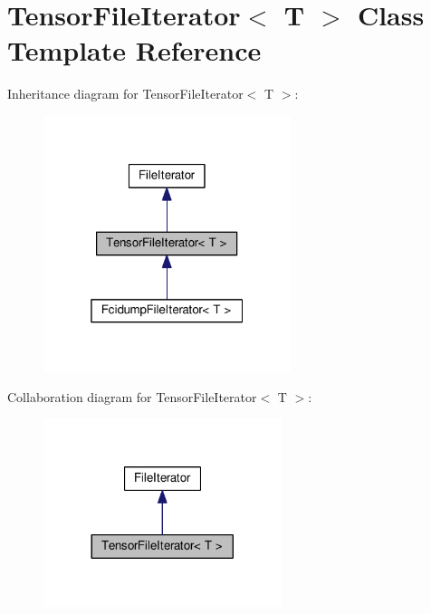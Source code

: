 \hypertarget{classTensorFileIterator}{}\section{Tensor\+File\+Iterator$<$ T $>$ Class Template Reference}
\label{classTensorFileIterator}


Inheritance diagram for Tensor\+File\+Iterator$<$ T $>$\+:
\nopagebreak
\begin{figure}[H]
\begin{center}
\leavevmode
\includegraphics[width=205pt]{classTensorFileIterator__inherit__graph}
\end{center}
\end{figure}


Collaboration diagram for Tensor\+File\+Iterator$<$ T $>$\+:
\nopagebreak
\begin{figure}[H]
\begin{center}
\leavevmode
\includegraphics[width=197pt]{classTensorFileIterator__coll__graph}
\end{center}
\end{figure}
